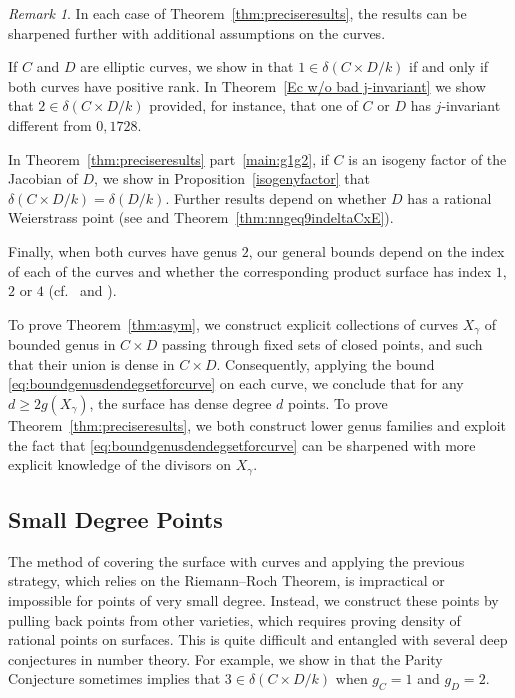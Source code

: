 \documentclass[a4paper,11pt]{amsart}
\theoremstyle{plain}
\theoremstyle{remark}
\newtheorem{remark}[thm]{Remark}
\newcommand{\dendegs}{\delta}
\begin{document}
\begin{remark}
In each case of Theorem~\ref{thm:preciseresults}, the results can be sharpened further with additional assumptions on the curves.

If \(C\) and \(D\) are elliptic curves, we show in   that $1\in \dendegs(C \times D/k)$ if and only if both curves have positive rank. In Theorem~\ref{Ec w/o bad j-invariant} we show that \(2 \in \dendegs(C \times D/k)\) provided, for instance, that one of \(C\) or \(D\) has \(j\)-invariant different from \(0, 1728\). 

In Theorem~\ref{thm:preciseresults} part~\ref{main:g1g2}, if $C$ is an isogeny factor of the Jacobian of $D$, we show in Proposition~\ref{isogenyfactor} that $\dendegs(C \times D / k) = \dendegs(D / k)$. 
Further results depend on whether $D$ has a rational Weierstrass point (see  and Theorem~\ref{thm:nngeq9indeltaCxE}).

Finally, when both curves have genus $2$, our general bounds depend on the index of each of the curves and whether the corresponding product surface has index \(1\), $2$ or $4$
(cf.~ and ).
\end{remark}

To prove Theorem~\ref{thm:asym}, we construct explicit collections of curves \(X_\gamma\) of bounded genus in $C \times D$ passing through fixed sets of closed points, and such that their union is dense in \(C \times D\). 
Consequently, applying the bound \eqref{eq:boundgenusdendegsetforcurve} on each curve, we conclude that for any $d \geq 2 g(X_\gamma)$, the surface has dense degree \(d\) points. To prove Theorem~\ref{thm:preciseresults}, we both construct lower genus families and exploit the fact that \eqref{eq:boundgenusdendegsetforcurve} can be sharpened with more explicit knowledge of the divisors on \(X_\gamma\). 

\subsection{Small Degree Points}
The method of covering the surface with curves and applying the previous strategy, which relies on the Riemann--Roch Theorem, is impractical or impossible for points of very small degree.  Instead, we construct these points by pulling back points from other varieties, which requires proving density of rational points on surfaces.  This is quite difficult and entangled with several deep conjectures in number theory. For example, 
we show in  that the Parity Conjecture sometimes implies that \(3 \in \dendegs(C\times D/k)\) when \(g_C=1\) and \(g_D = 2\).
\end{document}
